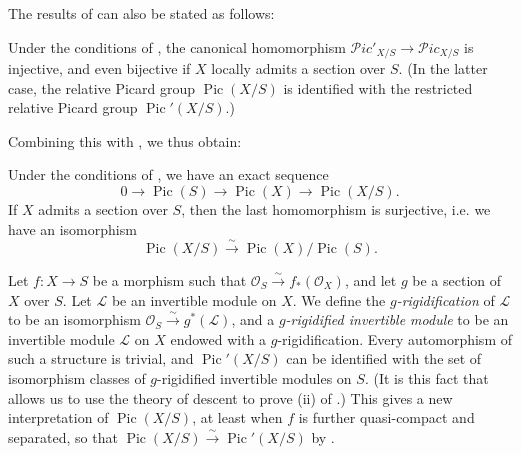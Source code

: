 The results of  can also be stated as follows:


\begin{corollary}\label{fga3.v-2-corollary-2.3}
    Under the conditions of , the canonical homomorphism  $\mathcal{P}ic'_{X/S}\to\mathcal{P}ic_{X/S}$ is injective, and even bijective if $X$ locally admits a section over $S$.
    (In the latter case, the relative Picard group $\operatorname{Pic}(X/S)$ is identified with the restricted relative Picard group $\operatorname{Pic}'(X/S)$.)
\end{corollary}

Combining this with , we thus obtain:


\begin{corollary}\label{fga3.v-2-corollary-2.4}
    Under the conditions of , we have an exact sequence
    \[
        0
        \to \operatorname{Pic}(S)
        \to \operatorname{Pic}(X)
        \to \operatorname{Pic}(X/S).
    \]
    If $X$ admits a section over $S$, then the last homomorphism is surjective, i.e. we have an isomorphism
    \[
        \operatorname{Pic}(X/S)
        \xrightarrow{\sim} \operatorname{Pic}(X)/\operatorname{Pic}(S).
    \]
\end{corollary}

\begin{remark}\label{fga3.v-2-remark-2.5}
    Let $f\colon X\to S$ be a morphism such that $\mathcal{O}_S\xrightarrow{\sim} f_*(\mathcal{O}_X)$, and let $g$ be a section of $X$ over $S$.
    Let $\mathcal{L}$ be an invertible module on $X$.
    We define the \emph{$g$-rigidification} of $\mathcal{L}$ to be an isomorphism $\mathcal{O}_S\xrightarrow{\sim} g^*(\mathcal{L})$, and a \emph{$g$-rigidified invertible module} to be an invertible module $\mathcal{L}$ on $X$ endowed with a $g$-rigidification.
    Every automorphism of such a structure is trivial, and $\operatorname{Pic}'(X/S)$ can be identified with the set of isomorphism classes of $g$-rigidified invertible modules on $S$.
    (It is this fact that allows us to use the theory of descent to prove (ii) of .)
    This gives a new interpretation of $\operatorname{Pic}(X/S)$, at least when $f$ is further quasi-compact and separated, so that $\operatorname{Pic}(X/S)\xrightarrow{\sim}\operatorname{Pic}'(X/S)$ by .
\end{remark}

